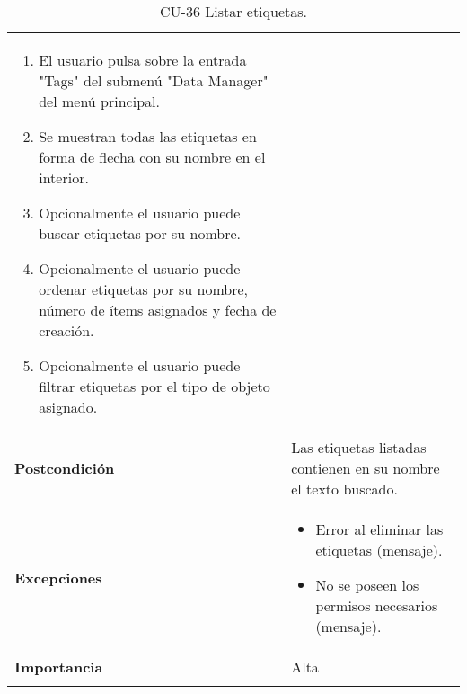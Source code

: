 \begin{longtable}[]{@{}ll@{}}
\begin{minipage}[t]{0.77\columnwidth}
\begin{enumerate}
\def\labelenumi{\arabic{enumi}.}
\tightlist
\item
  El usuario pulsa sobre la entrada "Tags" del submenú "Data Manager"
  del menú principal.
\item
  Se muestran todas las etiquetas en forma de flecha con su nombre en el
  interior.
\item
  Opcionalmente el usuario puede buscar etiquetas por su nombre.
\item
  Opcionalmente el usuario puede ordenar etiquetas por su nombre, número
  de ítems asignados y fecha de creación.
\item
  Opcionalmente el usuario puede filtrar etiquetas por el tipo de objeto
  asignado.
\end{enumerate}\strut
\end{minipage}\tabularnewline
\begin{minipage}[t]{0.17\columnwidth}\raggedright
\textbf{Postcondición}\strut
\end{minipage} & \begin{minipage}[t]{0.77\columnwidth}\raggedright
Las etiquetas listadas contienen en su nombre el texto buscado.\strut
\end{minipage}\tabularnewline
\begin{minipage}[t]{0.17\columnwidth}\raggedright
\textbf{Excepciones}\strut
\end{minipage} & \begin{minipage}[t]{0.77\columnwidth}\raggedright
\begin{itemize}
\tightlist
\item
  Error al eliminar las etiquetas (mensaje).
\item
  No se poseen los permisos necesarios (mensaje).
\end{itemize}\strut
\end{minipage}\tabularnewline
\begin{minipage}[t]{0.17\columnwidth}\raggedright
\textbf{Importancia}\strut
\end{minipage} & \begin{minipage}[t]{0.77\columnwidth}\raggedright
Alta\strut
\end{minipage}\tabularnewline
\bottomrule
\caption{CU-36 Listar etiquetas.}
\end{longtable}

